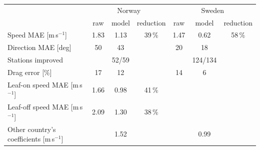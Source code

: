 \begin{tabular}{>{\raggedright\arraybackslash}p{}cccccc}
\toprule
 & \multicolumn{3}{c}{Norway} & \multicolumn{3}{c}{Sweden} \\
 & raw & model & reduction & raw & model & reduction \\
\midrule
Speed MAE [m\,s$^{-1}$] & 1.83 & 1.13 & 39\,\% & 1.47 & 0.62 & 58\,\% \\
Direction MAE [deg] & 50 & 43 & & 20 & 18 & \\
Stations improved & & 52/59 & & & 124/134 & \\
Drag error [\%] & 17 & 12 & & 14 & 6 & \\
Leaf-on speed MAE [m\,s$^{-1}$] & 1.66 & 0.98 & 41\,\% & & & \\
Leaf-off speed MAE [m\,s$^{-1}$] & 2.09 & 1.30 & 38\,\% & & & \\
Other country's coefficients [m\,s$^{-1}$] & & 1.52 & & & 0.99 & \\
\bottomrule
\end{tabular}

